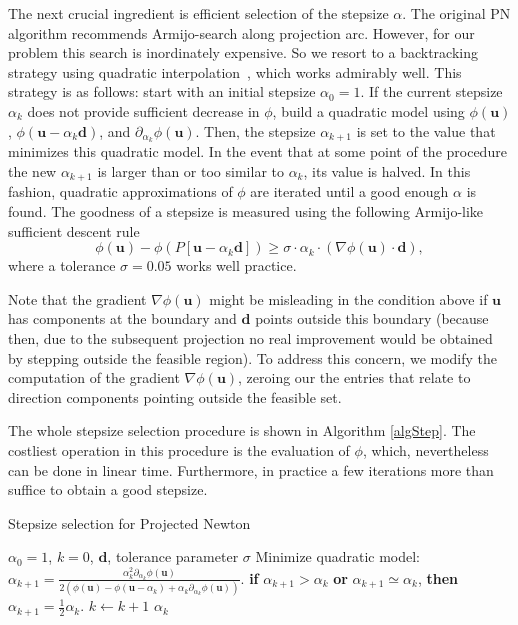 \documentclass[twoside,11pt]{article}
\newcommand{\vd}{\bm{d}}       \newcommand{\vdh}{\hat{\bm{d}}}        \newcommand{\dhat}{\hat{d}}  \newcommand{\vdt}{\tilde{\bm{d}}}       \newcommand{\dt}{\tilde{d}}
\newcommand{\vu}{\bm{u}}       \newcommand{\vuh}{\hat{\bm{u}}}        \newcommand{\uh}{\hat{u}}    \newcommand{\vut}{\tilde{\bm{u}}}       \newcommand{\ut}{\tilde{u}}
\newcommand{\half}{\tfrac{1}{2}}
\numberwithin{equation}{section}
\numberwithin{theorem}{section}
\begin{document}
The next crucial ingredient is efficient selection of the stepsize $\alpha$. The original PN algorithm \citet{ProjNewton} recommends Armijo-search along projection arc. However, for our problem this search is inordinately expensive. So we resort to a backtracking strategy using quadratic interpolation~\citep{NumOptNocedal}, which works admirably well. This strategy is as follows: start with an initial stepsize $\alpha_0=1$. If the current stepsize $\alpha_k$ does not provide sufficient decrease in $\phi$, build a quadratic model using $\phi(\vu)$, $\phi(\vu-\alpha_k\vd)$, and $\partial_{\alpha_k} \phi(\vu)$. Then, the stepsize $\alpha_{k+1}$ is set to the value that minimizes this quadratic model. In the event that at some point of the procedure the new $\alpha_{k+1}$ is larger than or too similar to $\alpha_k$, its value is halved. In this fashion, quadratic approximations of $\phi$ are iterated until a good enough $\alpha$ is found. The goodness of a stepsize is measured using the following
Armijo-like sufficient descent rule
\begin{equation*}
 \phi(\vu) - \phi(P \left[ \vu-\alpha_k\vd \right]) \geq \sigma \cdot \alpha_k \cdot \left( \nabla\phi(\vu) \cdot \vd \right),
\end{equation*}
where a tolerance $\sigma = 0.05$ works well practice.

Note that the gradient $\nabla \phi(\vu)$ might be misleading in the condition above if $\vu$ has components at the boundary and $\vd$ points outside this boundary (because then, due to the subsequent projection no real improvement would be obtained by stepping outside the feasible region). To address this concern, we modify the computation of the gradient $\nabla \phi(\vu)$, zeroing our the entries that relate to direction components pointing outside the feasible set.

The whole stepsize selection procedure is shown in Algorithm \ref{algStep}. The costliest operation in this procedure is the evaluation of $\phi$, which, nevertheless can be done in linear time. Furthermore, in practice a few iterations more than suffice to obtain a good stepsize.

 \begin{algorithm}[t]
  \caption{\small Stepsize selection for Projected Newton}
  \label{algStep}
  \begin{algorithmic}
    $\alpha_0 = 1$, $k=0$, $\vd$, tolerance parameter $\sigma$
   \While{$\phi(\vu) - \phi(P[\vu-\alpha_k \vd]) < \sigma \cdot \alpha_k \cdot \left( \nabla\phi(\vu) \cdot \vd \right) $}
    \State Minimize quadratic model: $\alpha_{k+1} = \frac{\alpha_k^2 \partial_{\alpha_k} \phi(\vu)}{2 (\phi(\vu) - \phi(\vu - \alpha_k) + \alpha_k \partial_{\alpha_k} \phi(\vu))}$.
    \State \textbf{if} $\alpha_{k+1} > \alpha_k$ \textbf{or} $\alpha_{k+1} \simeq \alpha_k$, \textbf{then} $\alpha_{k+1} = \half \alpha_k$.
    \State $k \gets k + 1$
   \EndWhile
   \State\Return $\alpha_k$
  \end{algorithmic}
 \end{algorithm}
\end{document}
